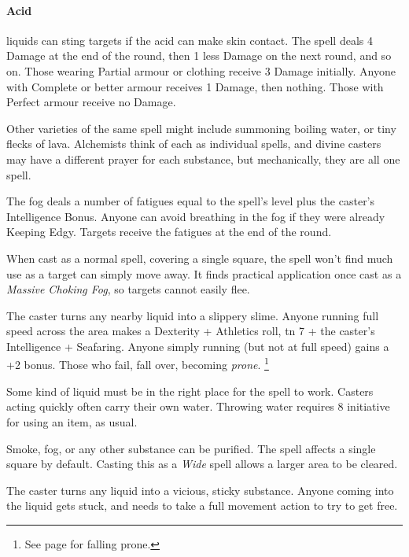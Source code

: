 \begin{multicols}{2}
\paragraph{Acid}
liquids can sting targets if the acid can make skin contact.
The spell deals 4 Damage at the end of the round, then 1 less Damage on the next round, and so on.
Those wearing Partial armour or clothing receive 3 Damage initially.
Anyone with Complete or better armour receives 1 Damage, then nothing.
Those with Perfect armour receive no Damage.

Other varieties of the same spell might include summoning boiling water, or tiny flecks of lava.
Alchemists think of each as individual spells, and divine casters may have a different prayer for each substance, but mechanically, they are all one spell.

The fog deals a number of \glspl{fatigue} equal to the spell's level plus the caster's Intelligence Bonus.
Anyone can avoid breathing in the fog if they were already Keeping Edgy.
Targets receive the \glspl{fatigue} at the end of the round.

When cast as a normal spell, covering a single square, the spell won't find much use as a target can simply move away.
It finds practical application once cast as a \textit{Massive Choking Fog}, so targets cannot easily flee.

The caster turns any nearby liquid into a slippery slime.
Anyone running full speed across the area makes a Dexterity + Athletics roll, \gls{tn} 7 + the caster's Intelligence + Seafaring.
Anyone simply running (but not at full speed) gains a +2 bonus.
Those who fail, fall over, becoming \textit{prone}.%
\footnote{See page \pageref{prone} for falling prone.}

Some kind of liquid must be in the right place for the spell to work.
Casters acting quickly often carry their own water.
Throwing water requires 8 initiative for using an item, as usual.

Smoke, fog, or any other substance can be purified.
The spell affects a single square by default.
Casting this as a \textit{Wide} spell allows a larger area to be cleared.

The caster turns any liquid into a vicious, sticky substance.
Anyone coming into the liquid gets stuck, and needs to take a full movement action to try to get free.


\end{multicols}
